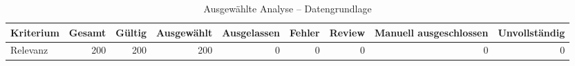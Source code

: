 \begin{table}[htbp]
\centering
\caption{Ausgewählte Analyse -- Datengrundlage}
\begin{tabular}{lrrrrrrrr}
\toprule
Kriterium & Gesamt & Gültig & Ausgewählt & Ausgelassen & Fehler & Review & Manuell ausgeschlossen & Unvollständig \\
\midrule
Relevanz & 200 & 200 & 200 & 0 & 0 & 0 & 0 & 0 \\
\bottomrule
\end{tabular}
\end{table}
